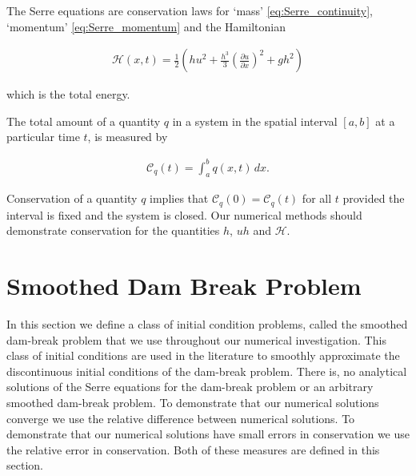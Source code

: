 \documentclass[times]{elsarticle}
\begin{document}
The Serre equations are conservation laws for `mass' \eqref{eq:Serre_continuity}, `momentum' \eqref{eq:Serre_momentum} and the Hamiltonian \cite{Li-Y-2002,Green-Naghdi-1976-237}
\begin{linenomath*}
	\begin{gather}
	\label{eqn:Hamildef}
	\mathcal{H}(x,t) = \frac{1}{2} \left(hu^2 + \frac{h^3}{3} \left(\frac{\partial u}{\partial x}\right)^2 + gh^2\right)
	\end{gather}
\end{linenomath*}
which is the total energy.

The total amount of a quantity $q$ in a system in the spatial interval $[a,b]$ at a particular time $t$, is measured by
\begin{linenomath*}
\begin{gather*}
\label{eqn:Condef}
\mathcal{C}_q(t) = \int_{a}^{b} q(x,t)\, dx .
\end{gather*}
\end{linenomath*}
Conservation of a quantity $q$ implies that $\mathcal{C}_{q}(0) = \mathcal{C}_{q}(t)$ for all $t$ provided the interval is fixed and the system is closed. Our numerical methods should demonstrate conservation for the quantities $h$, $uh$ and $\mathcal{H}$.


\section{Smoothed Dam Break Problem}
\label{section:smootheddambreak}
In this section we define a class of initial condition problems, called the smoothed dam-break problem that we use throughout our numerical investigation. This class of initial conditions are used in the literature \cite{Mitsotakis-etal-2014,Mitsotakis-etal-2017} to smoothly approximate the discontinuous initial conditions of the dam-break problem. There is, no analytical solutions of the Serre equations for the dam-break problem or an arbitrary smoothed dam-break problem. To demonstrate that our numerical solutions converge we use the relative difference between numerical solutions. To demonstrate that our numerical solutions have small errors in conservation we use the relative error in conservation. Both of these measures are defined in this section.
\end{document}
